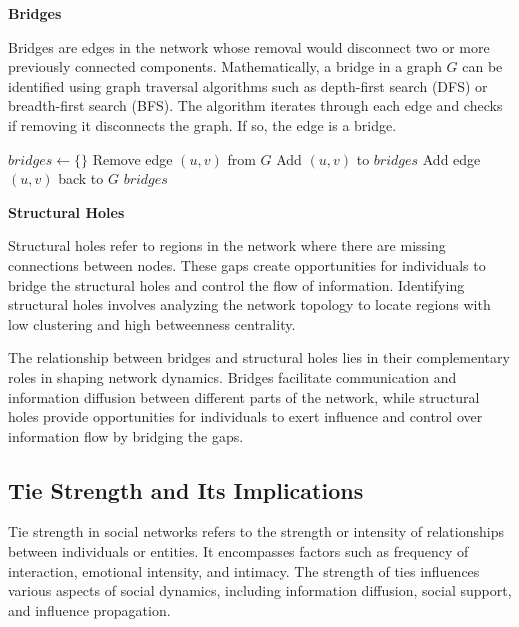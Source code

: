 \documentclass[12pt]{book} %
\begin{document}
\textbf{Bridges}

Bridges are edges in the network whose removal would disconnect two or more previously connected components. Mathematically, a bridge in a graph \(G\) can be identified using graph traversal algorithms such as depth-first search (DFS) or breadth-first search (BFS). The algorithm iterates through each edge and checks if removing it disconnects the graph. If so, the edge is a bridge.
\FloatBarrier
\begin{algorithm}[H]
\caption{Bridge Detection Algorithm}
\begin{algorithmic}[1]
    \State $bridges \gets \{\}$
        \State Remove edge $(u, v)$ from $G$
            \State Add $(u, v)$ to $bridges$
        \EndIf
        \State Add edge $(u, v)$ back to $G$
    \EndFor
    \State \Return $bridges$
\EndFunction
\end{algorithmic}
\end{algorithm}
\FloatBarrier

\textbf{Structural Holes}

Structural holes refer to regions in the network where there are missing connections between nodes. These gaps create opportunities for individuals to bridge the structural holes and control the flow of information. Identifying structural holes involves analyzing the network topology to locate regions with low clustering and high betweenness centrality.

The relationship between bridges and structural holes lies in their complementary roles in shaping network dynamics. Bridges facilitate communication and information diffusion between different parts of the network, while structural holes provide opportunities for individuals to exert influence and control over information flow by bridging the gaps.

\subsection{Tie Strength and Its Implications}

Tie strength in social networks refers to the strength or intensity of relationships between individuals or entities. It encompasses factors such as frequency of interaction, emotional intensity, and intimacy. The strength of ties influences various aspects of social dynamics, including information diffusion, social support, and influence propagation.
\end{document}
